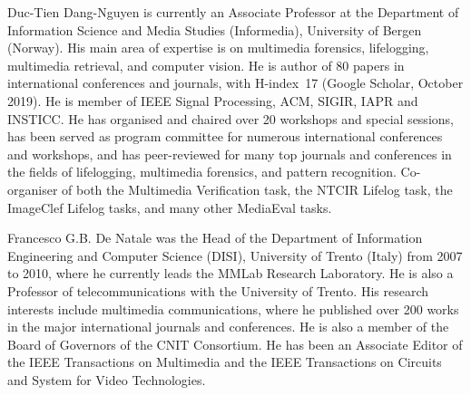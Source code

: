 \documentclass{ieeeaccess}
\begin{document}
\begin{IEEEbiography}{Duc-Tien Dang-Nguyen} is currently an Associate Professor at the Department of Information Science and Media Studies (Informedia), University of Bergen (Norway). His main area of expertise is on multimedia forensics, lifelogging, multimedia retrieval, and computer vision. 
%
He is author of 80 papers in international conferences and journals, with H-index~17 (Google Scholar, October 2019). He is member of IEEE Signal Processing, ACM, SIGIR, IAPR and INSTICC.  
He has organised and chaired over 20 workshops and special sessions, has been served as program committee for numerous international conferences and workshops, and has peer-reviewed for many top journals and conferences in the fields of lifelogging, multimedia forensics, and pattern recognition. Co-organiser of both the Multimedia Verification task, the NTCIR Lifelog task, the ImageClef Lifelog tasks, and many other MediaEval tasks. 
\end{IEEEbiography}

\begin{IEEEbiography}{Francesco G.B. De Natale} was the Head of the Department of Information Engineering and Computer Science (DISI), University of Trento (Italy) from 2007 to 2010, where he currently leads the MMLab Research Laboratory. He is also a Professor of telecommunications with the University of Trento. His research interests include multimedia communications, where he published over 200 works in the major international journals and conferences. He is also a member of the Board of Governors of the CNIT Consortium. He has been an Associate Editor of the IEEE Transactions on Multimedia and the IEEE Transactions on Circuits and System for Video Technologies.
\end{IEEEbiography}

\EOD
\end{document}
